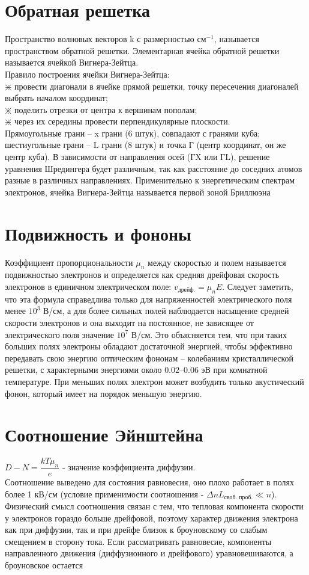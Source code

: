 \begin{multicols*}{2}
		\section{Обратная решетка}
		Пространство волновых векторов k с размерностью $\text{см}^{-1}$, называется пространством обратной решетки. Элементарная ячейка обратной решетки называется ячейкой Вигнера-Зейтца.\\
		Правило построения ячейки Вигнера-Зейтца:\\
		$\divideontimes$ провести диагонали в ячейке прямой решетки, точку пересечения диагоналей выбрать началом координат;\\
		$\divideontimes$ поделить отрезки от центра к вершинам пополам;\\
		$\divideontimes$ через их середины провести перпендикулярные плоскости.\\
		Прямоугольные грани – x грани (6 штук), совпадают с гранями куба; шестиугольные грани – L грани (8 штук) и точка Г (центр координат, он же центр куба). В зависимости от направления осей (ГX или ГL), решение уравнения Шредингера будет различным, так как расстояние до соседних атомов разные в различных направлениях. Применительно к энергетическим спектрам электронов, ячейка Вигнера-Зейтца называется первой зоной Бриллюэна

		\section{Подвижность и фононы}
		Коэффициент пропорциональности $\mu_n$ между скоростью и полем называется подвижностью электронов и определяется как средняя дрейфовая скорость электронов в единичном электрическом поле: $v_\text{дрейф.} = \mu_n E$. Следует заметить, что эта формула справедлива только для напряженностей электрического поля менее $10^3$ В/см, а для более сильных полей наблюдается насыщение средней скорости электронов и она выходит на постоянное, не зависящее от электрического поля значение $10^7$ В/см. Это объясняется тем, что при таких больших полях электроны обладают достаточной энергией, чтобы эффективно передавать свою энергию оптическим фононам – колебаниям кристаллической решетки, с характерными энергиями около $0.02–0.06$ эВ при комнатной температуре. При меньших полях электрон может возбудить только акустический фонон, который имеет на порядок меньшую энергию.

		\section{Соотношение Эйнштейна}
		$D-N = \dfrac{kT\mu_n}{e}$ - значение коэффициента диффузии. \\
		Соотношение выведено для состояния равновесия, оно плохо работает в полях более 1 кВ/см (условие применимости соотношения - $\Delta n L_\text{своб. проб.}\ll n$). Физический смысл соотношения связан с тем, что тепловая компонента скорости у электронов гораздо больше дрейфовой, поэтому характер движения электрона как при диффузии, так и при дрейфе близок к броуновскому со слабым смещением в сторону тока. Если рассматривать равновесие, компоненты направленного движения (диффузионного и дрейфового) уравновешиваются, а броуновское остается


\end{multicols*}
